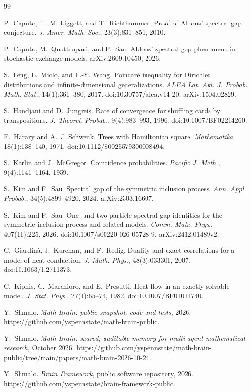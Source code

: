 \documentclass[11pt]{article}
\theoremstyle{remark}
\begin{document}
\begin{thebibliography}{99}

P.~Caputo, T.~M. Liggett, and T.~Richthammer.
\newblock Proof of Aldous' spectral gap conjecture.
\newblock \emph{J. Amer. Math. Soc.}, 23(3):831--851, 2010.

P.~Caputo, M.~Quattropani, and F.~Sau.
\newblock Aldous' spectral gap phenomena in stochastic exchange models.
\newblock arXiv:2609.10450, 2026.

S.~Feng, L.~Miclo, and F.-Y. Wang.
\newblock Poincar\'e inequality for Dirichlet distributions and infinite-dimensional generalizations.
\newblock \emph{ALEA Lat. Am. J. Probab. Math. Stat.}, 14(1):361--380, 2017. doi:10.30757/alea.v14-20. arXiv:1504.02829.

S.~Handjani and D.~Jungreis.
\newblock Rate of convergence for shuffling cards by transpositions.
\newblock \emph{J. Theoret. Probab.}, 9(4):983--993, 1996. doi:10.1007/BF02214260.

F.~Harary and A.~J. Schwenk.
\newblock Trees with {H}amiltonian square.
\newblock \emph{Mathematika}, 18(1):138--140, 1971. doi:10.1112/S0025579300008494.

S.~Karlin and J.~McGregor.
\newblock Coincidence probabilities.
\newblock \emph{Pacific J. Math.}, 9(4):1141--1164, 1959.

S.~Kim and F.~Sau.
\newblock Spectral gap of the symmetric inclusion process.
\newblock \emph{Ann. Appl. Probab.}, 34(5):4899--4920, 2024.
\newblock arXiv:2303.16607.

S.~Kim and F.~Sau.
\newblock One- and two-particle spectral gap identities for the symmetric inclusion process and related models.
\newblock \emph{Comm. Math. Phys.}, 407(11):225, 2026. doi:10.1007/s00220-026-05728-9. arXiv:2412.01489v2.

C.~Giardin\`a, J.~Kurchan, and F.~Redig.
\newblock Duality and exact correlations for a model of heat conduction.
\newblock \emph{J. Math. Phys.}, 48(3):033301, 2007. doi:10.1063/1.2711373.

C.~Kipnis, C.~Marchioro, and E.~Presutti.
\newblock Heat flow in an exactly solvable model.
\newblock \emph{J. Stat. Phys.}, 27(1):65--74, 1982. doi:10.1007/BF01011740.

Y.~Shmalo.
\newblock \emph{Math Brain: public snapshot, code and tests}, 2026.
\newblock \url{https://github.com/yspennstate/math-brain-public}.

Y.~Shmalo.
\newblock \emph{Math Brain: shared, auditable memory for multi-agent mathematical research}, October 2026.
\newblock \url{https://github.com/yspennstate/math-brain-public/tree/main/papers/math-brain-2026-10-24}.

Y.~Shmalo.
\newblock \emph{Brain Framework}, public software repository, 2026.
\newblock \url{https://github.com/yspennstate/brain-framework-public}.

\end{thebibliography}
\end{document}
